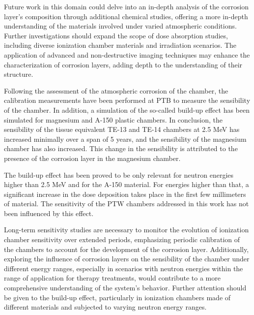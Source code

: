 Future work in this domain could delve into an in-depth analysis of the corrosion layer's composition through additional chemical studies, offering a more in-depth understanding of the materials involved under varied atmospheric conditions. Further investigations should expand the scope of dose absorption studies, including diverse ionization chamber materials and irradiation scenarios. The application of advanced and non-destructive imaging techniques may enhance the characterization of corrosion layers, adding depth to the understanding of their structure.

Following the assessment of the atmospheric corrosion of the chamber, the calibration measurements have been performed at PTB to measure the sensibility of the chamber. In addition, a simulation of the so-called build-up effect has been simulated for magnesium and A-150 plastic chambers. In conclusion, the sensibility of the tissue equivalent TE-13 and TE-14 chambers at 2.5 \unit{\mega\electronvolt} has increased minimally over a span of 5 years, and the sensibility of the magnesium chamber has also increased. This change in the sensibility is attributed to the presence of the corrosion layer in the magnesium chamber.

The build-up effect has been proved to be only relevant for neutron energies higher than 2.5 \unit{\mega\electronvolt} and for the A-150 material. For energies higher than that, a significant increase in the dose deposition takes place in the first few millimeters of material. The sensitivity of the PTW chambers addressed in this work has not been influenced by this effect.

Long-term sensitivity studies are necessary to monitor the evolution of ionization chamber sensitivity over extended periods, emphasizing periodic calibration of the chambers to account for the development of the corrosion layer. Additionally, exploring the influence of corrosion layers on the sensibility of the chamber under different energy ranges, especially in scenarios with neutron energies within the range of application for therapy treatments, would contribute to a more comprehensive understanding of the system's behavior. Further attention should be given to the build-up effect, particularly in ionization chambers made of different materials and subjected to varying neutron energy ranges.

